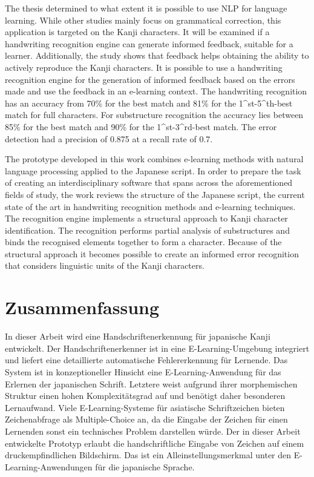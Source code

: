 The thesis determined to what extent it is possible to use NLP for 
language learning. While other studies mainly focus on grammatical
correction, this application is targeted on the Kanji characters. It will be 
examined if a handwriting recognition engine can generate informed feedback,
suitable for a learner. Additionally, the study shows that feedback helps 
obtaining the ability to actively reproduce the Kanji characters.
It is possible to use a handwriting recognition engine for the generation of 
informed feedback based on the errors made and use the feedback
in an e-learning context.
The handwriting recognition has an accuracy from 70\% for the best match
and 81\% for the 1^{st}-5^{th}-best match for full characters.
For substructure recognition the accuracy lies between 85\% for the best match
and 90\% for the 1^{st}-3^{rd}-best match.
The error detection had a precision of 0.875 at a recall rate of 0.7.

The prototype developed in this work combines e-learning methods with natural
language processing applied to the Japanese script. In order to prepare the 
task of creating an interdisciplinary software that spans across the 
aforementioned fields of study, the work reviews the structure 
of the Japanese script, the current state of the art in handwriting 
recognition methods and e-learning techniques.
The recognition engine implements a structural approach to Kanji character 
identification. The recognition performs partial analysis of substructures
and binds the recognised elements together to form a character.
Because of the structural approach it becomes possible to create an informed
error recognition that considers linguistic units of the Kanji characters.

\chapter*{Zusammenfassung}
\label{chap:zusammenfassung}

In dieser Arbeit wird eine Handschriftenerkennung für japanische Kanji 
entwickelt. Der Handschriftenerkenner ist in eine E-Learning-Umgebung integriert 
und liefert eine detaillierte automatische Fehlererkennung für Lernende.
Das System ist in konzeptioneller Hinsicht eine E-Learning-Anwendung für das 
Erlernen der japanischen Schrift. Letztere weist aufgrund ihrer morphemischen 
Struktur einen hohen Komplexitätsgrad auf und benötigt daher besonderen 
Lernaufwand. Viele E-Learning-Systeme für asiatische Schriftzeichen bieten 
Zeichenabfrage als Multiple-Choice an, da die Eingabe der Zeichen für einen 
Lernenden sonst ein technisches Problem darstellen würde.
Der in dieser Arbeit entwickelte Prototyp erlaubt die
handschriftliche Eingabe von Zeichen auf einem druckempfindlichen Bildschirm.
Das ist ein Alleinstellungsmerkmal unter den E-Learning-Anwendungen 
für die japanische Sprache.

